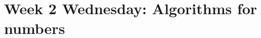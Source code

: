 \documentclass[12pt, oneside]{article}
\begin{document}

\newpage
\section*{Week 2 Wednesday: Algorithms for numbers}
\end{document}

